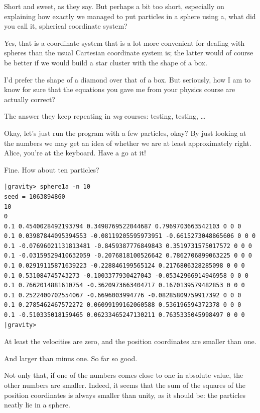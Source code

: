 \abc

\bob
Short and sweet, as they say.  But perhaps a bit too short, especially
on explaining how exactly we managed to put particles in a sphere
using a, what did you call it, spherical coordinate system?

\alice
Yes, that is a coordinate system that is a lot more convenient for
dealing with spheres than the usual Cartesian coordinate system is;
the latter would of course be better if we would build a star cluster
with the shape of a box.

\bob
I'd prefer the shape of a diamond over that of a box.  But seriously,
how I am to know for sure that the equations you gave me from your
physics course are actually correct?

\carol
The answer they keep repeating in {\it my} courses: testing, testing, \dots

\bob
Okay, let's just run the program with a few particles, okay?  By just
looking at the numbers we may get an idea of whether we are at least
approximately right.  Alice, you're at the keyboard.  Have a go at it!

\alice
Fine.  How about ten particles?

\cba

\begin{small}
\begin{verbatim}
|gravity> sphere1a -n 10
seed = 1063894860
10
0
0.1 0.4540028492193794 0.3498769522044687 0.7969703663542103 0 0 0
0.1 0.03987844095394553 -0.08119205595973951 -0.6615273048865606 0 0 0
0.1 -0.07696021131813481 -0.8459387776849843 0.3519731575017572 0 0 0
0.1 -0.03159529410632059 -0.2076818100526642 0.7862706899063225 0 0 0
0.1 0.02919115871639223 -0.228846199565124 0.2176806328285098 0 0 0
0.1 0.531084745743273 -0.1003377930427043 -0.05342966914946958 0 0 0
0.1 0.7662014881610754 -0.3620973663404717 0.1670139579482853 0 0 0
0.1 0.2522400702554067 -0.6696003994776 -0.08285809759917392 0 0 0
0.1 0.2785462467572272 0.06099199162060588 0.536196594372378 0 0 0
0.1 -0.510335018159465 0.06233465247130211 0.7635335045998497 0 0 0
|gravity> 
\end{verbatim}
\end{small}

\abc

\bob
At least the velocities are zero, and the position coordinates are
smaller than one.

\carol
And larger than minus one.  So far so good.

\alice
Not only that, if one of the numbers comes close to one in absolute value,
the other numbers are smaller.  Indeed, it seems that the sum of the
squares of the position coordinates is always smaller than unity, as
it should be: the particles neatly lie in a sphere.

